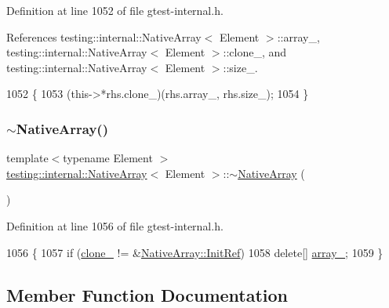 Definition at line 1052 of file gtest-\/internal.\+h.



References testing\+::internal\+::\+Native\+Array$<$ Element $>$\+::array\+\_\+, testing\+::internal\+::\+Native\+Array$<$ Element $>$\+::clone\+\_\+, and testing\+::internal\+::\+Native\+Array$<$ Element $>$\+::size\+\_\+.


\begin{DoxyCode}
1052                                       \{
1053     (this->*rhs.clone\_)(rhs.array\_, rhs.size\_);
1054   \}
\end{DoxyCode}
\mbox{\label{classtesting_1_1internal_1_1NativeArray_a55ab5948d473a487303dcf6e02ad1f60}} 
\subsubsection{\texorpdfstring{$\sim$\+Native\+Array()}{~NativeArray()}}
{\footnotesize\ttfamily template$<$typename Element $>$ \\
\hyperlink{classtesting_1_1internal_1_1NativeArray}{testing\+::internal\+::\+Native\+Array}$<$ Element $>$\+::$\sim$\hyperlink{classtesting_1_1internal_1_1NativeArray}{Native\+Array} (\begin{DoxyParamCaption}{ }\end{DoxyParamCaption})\hspace{0.3cm}{\ttfamily [inline]}}



Definition at line 1056 of file gtest-\/internal.\+h.


\begin{DoxyCode}
1056                  \{
1057     \textcolor{keywordflow}{if} (\hyperlink{classtesting_1_1internal_1_1NativeArray_addd7442a10398a60215a9989bcbd8078}{clone\_} != &\hyperlink{classtesting_1_1internal_1_1NativeArray_ac6ad6d79e17e2c98a9d4d684afcb7f79}{NativeArray::InitRef})
1058       \textcolor{keyword}{delete}[] \hyperlink{classtesting_1_1internal_1_1NativeArray_adadc025fbbbd43904d4036991019f18f}{array\_};
1059   \}
\end{DoxyCode}


\subsection{Member Function Documentation}
\mbox{\label{classtesting_1_1internal_1_1NativeArray_a3046d93cfa23097e7b7c91f5f982dc78}} 
